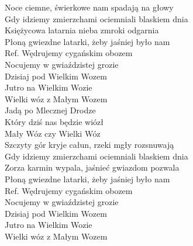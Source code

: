 
\begin{flushleft}
Noce ciemne, świerkowe nam spadają na głowy \\
Gdy idziemy zmierzchami ociemniali blaskiem dnia \\
Księżycowa latarnia nieba zmroki odgarnia  \tab{}\\
Płoną gwiezdne latarki, żeby jaśniej było nam  \tab{}\\
\vskip 3mm
Ref. Wędrujemy cygańskim obozem \tab{}\\
\hspace{0.9cm}Nocujemy w gwiaździstej grozie  \tab{}\\
\hspace{0.9cm}Dzisiaj pod Wielkim Wozem  \tab{}\\
\hspace{0.9cm}Jutro na Wielkim Wozie  \tab{}\tab{}\\
\vskip 3mm
\hspace{1.8cm}Wielki wóz z Małym Wozem  \tab{}\\
\hspace{1.8cm}Jadą po Mlecznej Drodze  \tab{}\\
\hspace{1.8cm}Który dziś nas będzie wiózł  \tab{}\\
\hspace{1.8cm}Mały Wóz czy Wielki Wóz  \tab{}\\
\vskip 3mm
Szczyty gór kryje całun, rzeki mgły rozsnuwają \\
Gdy idziemy zmierzchami ociemniali blaskiem dnia \\
Zorza karmin wypala, jaśnieć gwiazdom pozwala \\
Płoną gwiezdne latarki, żeby jaśniej było nam \\
\vskip 3mm
Ref. Wędrujemy cygańskim obozem\\
\hspace{0.9cm}Nocujemy w gwiaździstej grozie \\
\hspace{0.9cm}Dzisiaj pod Wielkim Wozem \\
\hspace{0.9cm}Jutro na Wielkim Wozie \\
\vskip 3mm
\hspace{1.8cm}Wielki wóz z Małym Wozem \\

\end{flushleft}
